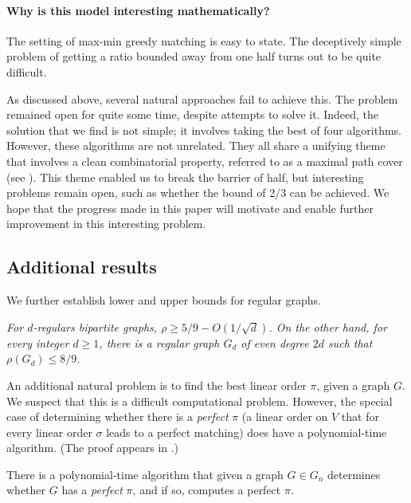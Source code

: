 %
%
%
%
%
%

%

\paragraph*{Why is this model interesting mathematically?} The setting of max-min greedy matching is easy to state.
%
%
%
The deceptively simple problem of getting a ratio bounded away
from one half turns out to be quite difficult.   %

As discussed above, several natural approaches fail to achieve this. The problem remained open for quite some time, despite attempts to solve it. Indeed, the solution that we find is not simple; it involves taking the best of four algorithms. However, these algorithms are not unrelated. They all share a unifying theme that involves a clean combinatorial property, referred to as a maximal path cover (see ). This theme enabled us to break the barrier of half, but interesting problems remain open, such as whether the bound of 2/3 can be achieved. We hope that the progress made in this
%
paper   %
will motivate and enable further improvement in this interesting problem.

\subsection{Additional results}
We further establish lower and upper bounds for regular graphs.

\vspace{0.1in}
%
\emph{For $d$-regulars bipartite graphs, $\rho \ge 5/9 - O(1/\sqrt{d})$.
On the other hand, for every integer $d \ge 1$, there is a regular graph $G_{d}$ of even degree $2d$ such that $\rho(G_{d}) \le 8/9$.}
\vspace{0.1in}

An additional natural problem is to find the best linear order $\pi$, given a graph $G$.
We suspect that this is a difficult computational problem.
However, the special case of determining whether there is a \emph{perfect} $\pi$ (a linear order on $V$ that for every linear order $\sigma$ leads to a perfect matching) does have a polynomial-time algorithm.  %
%
%
(The proof appears in .)

\vspace{0.1in}
\begin{theorem}
	\label{thm:perfect-pi}
There is a polynomial-time algorithm that given a graph $G \in G_n$ determines whether $G$ has a \emph{perfect} $\pi$, and if so,
%
computes   %
a perfect $\pi$.
\end{theorem}

